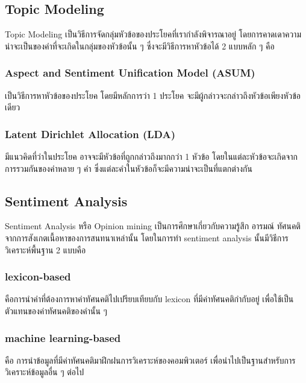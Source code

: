 \subsection{Topic Modeling}%
Topic Modeling เป็นวิธีการจัดกลุ่มหัวข้อของประโยคที่เรากำลังพิจารณาอยู่ โดยการคาดเดาความน่าจะเป็นของคำที่จะเกิดในกลุ่มของหัวข้อนั้น ๆ ซึ่งจะมีวิธีการหาหัวข้อได้ 2 แบบหลัก ๆ คือ
\subsubsection{Aspect and Sentiment Unification Model (ASUM)\cite{asum}}
เป็นวิธีการหาหัวข้อของประโยค โดยมีหลักการว่า 1 ประโยค จะมีผู้กล่าวจะกล่าวถึงหัวข้อเพียงหัวข้อเดียว
\subsubsection{Latent Dirichlet Allocation (LDA)\cite{LDA}}
มีแนวคิดที่ว่าในประโยค อาจจะมีหัวข้อที่ถูกกล่าวถึงมากกว่า 1 หัวข้อ โดยในแต่ละหัวข้อจะเกิดจากการรวมกันของคำหลาย ๆ คำ ซึ่งแต่ละคำในหัวข้อก็จะมีความน่าจะเป็นที่แตกต่างกัน

\subsection{Sentiment Analysis}
Sentiment Analysis หรือ Opinion mining เป็นการศึกษาเกี่ยวกับความรู้สึก อารมณ์ ทัศนคติ จากการสังเกตเนื้อหาของการสนทนาเหล่านั้น\cite{surveyopinionmining} โดยในการทำ sentiment analysis นั้นมีวิธีการวิเคราะห์พื้นฐาน 2 แบบคือ
\subsubsection{lexicon-based}
คือการนำคำที่ต้องการหาค่าทัศนคติไปเปรียบเทียบกับ lexicon ที่มีค่าทัศนคติกำกับอยู่ เพื่อใช้เป็นตัวแทนของค่าทัศนคติของคำนั้น ๆ
\subsubsection{machine learning-based}
คือ การนำข้อมูลที่มีค่าทัศนคติมาฝึกฝนการวิเคราะห์ของคอมพิวเตอร์ เพื่อนำไปเป็นฐานสำหรับการวิเคราะห์ข้อมูลอื่น ๆ ต่อไป
